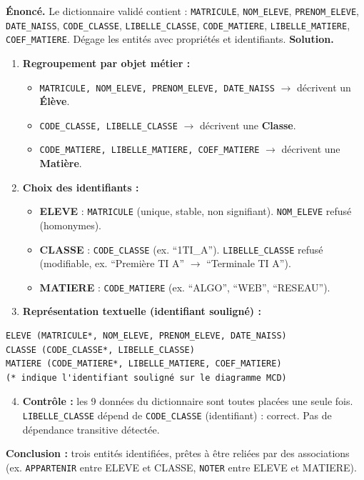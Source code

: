 \documentclass[11pt]{article}
\begin{document}
\begin{exoresolu}
\textbf{Énoncé.} Le dictionnaire validé contient : \texttt{MATRICULE}, \texttt{NOM\_ELEVE}, \texttt{PRENOM\_ELEVE}, \texttt{DATE\_NAISS}, \texttt{CODE\_CLASSE}, \texttt{LIBELLE\_CLASSE}, \texttt{CODE\_MATIERE}, \texttt{LIBELLE\_MATIERE}, \texttt{COEF\_MATIERE}. Dégage les entités avec propriétés et identifiants.
\tcblower
\textbf{Solution.}
\begin{enumerate}
  \item \textbf{Regroupement par objet métier :}
  \begin{itemize}
    \item \texttt{MATRICULE, NOM\_ELEVE, PRENOM\_ELEVE, DATE\_NAISS} $\rightarrow$ décrivent un \textbf{Élève}.
    \item \texttt{CODE\_CLASSE, LIBELLE\_CLASSE} $\rightarrow$ décrivent une \textbf{Classe}.
    \item \texttt{CODE\_MATIERE, LIBELLE\_MATIERE, COEF\_MATIERE} $\rightarrow$ décrivent une \textbf{Matière}.
  \end{itemize}
  \item \textbf{Choix des identifiants :}
  \begin{itemize}
    \item \textbf{ELEVE} : \texttt{MATRICULE} (unique, stable, non signifiant). \texttt{NOM\_ELEVE} refusé (homonymes).
    \item \textbf{CLASSE} : \texttt{CODE\_CLASSE} (ex. ``1TI\_A''). \texttt{LIBELLE\_CLASSE} refusé (modifiable, ex. ``Première TI A'' $\rightarrow$ ``Terminale TI A'').
    \item \textbf{MATIERE} : \texttt{CODE\_MATIERE} (ex. ``ALGO'', ``WEB'', ``RESEAU'').
  \end{itemize}
  \item \textbf{Représentation textuelle (identifiant souligné) :}
\end{enumerate}
\begin{lstlisting}
ELEVE (MATRICULE*, NOM_ELEVE, PRENOM_ELEVE, DATE_NAISS)
CLASSE (CODE_CLASSE*, LIBELLE_CLASSE)
MATIERE (CODE_MATIERE*, LIBELLE_MATIERE, COEF_MATIERE)
(* indique l'identifiant souligné sur le diagramme MCD)
\end{lstlisting}
\begin{enumerate}
  \setcounter{enumi}{3}
  \item \textbf{Contrôle :} les 9 données du dictionnaire sont toutes placées une seule fois. \texttt{LIBELLE\_CLASSE} dépend de \texttt{CODE\_CLASSE} (identifiant) : correct. Pas de dépendance transitive détectée.
\end{enumerate}
\textbf{Conclusion :} trois entités identifiées, prêtes à être reliées par des associations (ex. \texttt{APPARTENIR} entre ELEVE et CLASSE, \texttt{NOTER} entre ELEVE et MATIERE).
\end{exoresolu}
\end{document}
